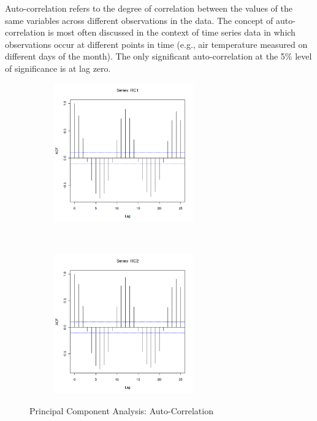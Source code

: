 \documentclass[12pt,a4paper]{article}
\begin{document}
Auto-correlation refers to the degree of correlation between the values of the same variables across different observations in the data.  The concept of auto-correlation is most often discussed in the context of time series data in which observations occur at different points in time (e.g., air temperature measured on different days of the month). 
The only significant auto-correlation at the 5\% level of significance is at lag zero. 
\begin{figure}[!h]
    \centering
    \begin{subfigure}[t]{0.5\textwidth}
        \centering
        \includegraphics[width=\textwidth,height=170pt]{./gaphics/q003_h.png}
        \caption{}
    \end{subfigure}%
    ~ 
    \begin{subfigure}[t]{0.5\textwidth}
        \centering
        \includegraphics[width=\textwidth,height=170pt]{./gaphics/q003_i.png}
        \caption{}
    \end{subfigure}
    \caption{Principal Component Analysis: Auto-Correlation}
\end{figure}
\end{document}
